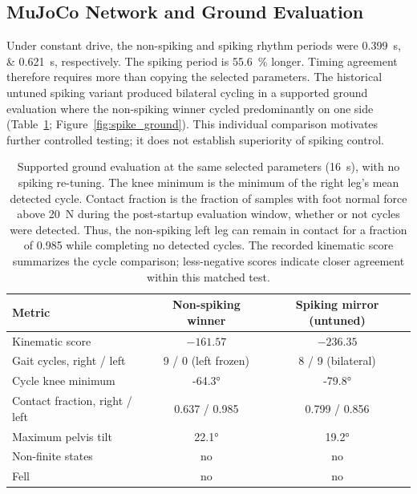 \subsection{MuJoCo Network and Ground Evaluation}

Under constant drive, the non-spiking and spiking rhythm periods were \qtylist{0.399;0.621}{\second}, respectively. The spiking period is \qty{55.6}{\percent} longer. Timing agreement therefore requires more than copying the selected parameters. The historical untuned spiking variant produced bilateral cycling in a supported ground evaluation where the non-spiking winner cycled predominantly on one side (Table~\ref{tab:spike_ground}; Figure~\ref{fig:spike_ground}). This individual comparison motivates further controlled testing; it does not establish superiority of spiking control.

\begin{table}[htbp]
\caption{Supported ground evaluation at the same selected parameters (\qty{16}{\second}), with no spiking re-tuning. The knee minimum is the minimum of the right leg's mean detected cycle. Contact fraction is the fraction of samples with foot normal force above \qty{20}{\newton} during the post-startup evaluation window, whether or not cycles were detected. Thus, the non-spiking left leg can remain in contact for a fraction of 0.985 while completing no detected cycles. The recorded kinematic score summarizes the cycle comparison; less-negative scores indicate closer agreement within this matched test.}
\label{tab:spike_ground}
\begin{tabular}{@{}lcc@{}}
\toprule
\textbf{Metric} & \textbf{Non-spiking winner} & \textbf{Spiking mirror (untuned)} \\
\midrule
Kinematic score                & $-161.57$          & $-236.35$ \\
Gait cycles, right / left      & 9 / 0 (left frozen) & 8 / 9 (bilateral) \\
Cycle knee minimum             & \ang{-64.3}         & \ang{-79.8} \\
Contact fraction, right / left     & 0.637 / 0.985       & 0.799 / 0.856 \\
Maximum pelvis tilt            & \ang{22.1}          & \ang{19.2} \\
Non-finite states              & no                  & no \\
Fell                            & no                  & no \\
\bottomrule
\end{tabular}
\end{table}

